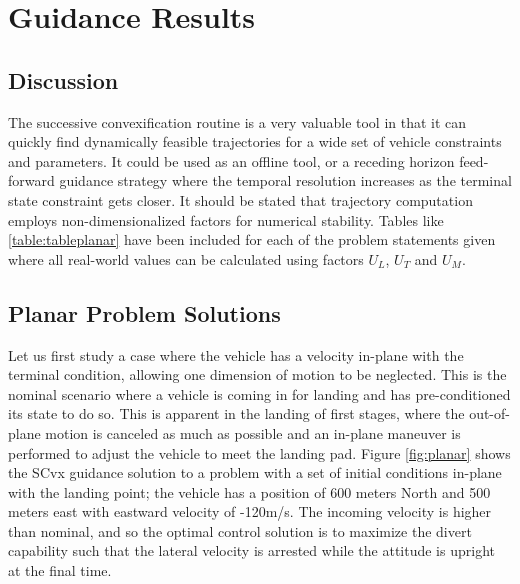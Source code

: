 \chapter{Guidance Results}
\label{results}



\section{Discussion}
The successive convexification routine is a very valuable tool in that it can quickly find dynamically feasible trajectories for a wide set of vehicle constraints and parameters. It could be used as an offline tool, or a receding horizon feed-forward guidance strategy where the temporal resolution increases as the terminal state constraint gets closer. It should be stated that trajectory computation employs non-dimensionalized factors for numerical stability. Tables like \ref{table:tableplanar} have been included for each of the problem statements given where all real-world values can be calculated using factors $U_L$, $U_T$ and $U_M$.


\section{Planar Problem Solutions}
Let us first study a case where the vehicle has a velocity in-plane with the terminal condition, allowing one dimension of motion to be neglected. This is the nominal scenario where a vehicle is coming in for landing and has pre-conditioned its state to do so. This is apparent in the landing of first stages, where the out-of-plane motion is canceled as much as possible and an in-plane maneuver is performed to adjust the vehicle to meet the landing pad. Figure \ref{fig:planar} shows the SCvx guidance solution to a problem with a set of initial conditions in-plane with the landing point; the vehicle has a position of 600 meters North and 500 meters east with eastward velocity of -120m/s. The incoming velocity is higher than nominal, and so the optimal control solution is to maximize the divert capability such that the lateral velocity is arrested while the attitude is upright at the final time.

